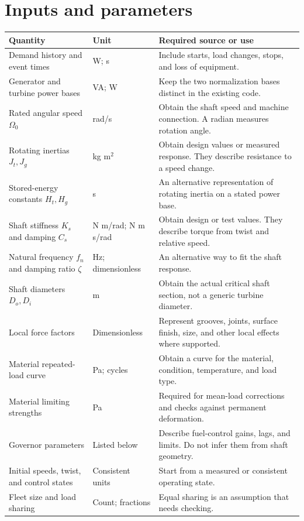 \documentclass[11pt,a4paper]{report}
\begin{document}
\section{Inputs and parameters}
\begin{longtable}{L{0.22\textwidth}L{0.17\textwidth}L{0.49\textwidth}}
\toprule Quantity & Unit & Required source or use \\ \midrule\endhead
Demand history and event times & W; s & Include starts, load changes, stops, and loss of equipment. \\
Generator and turbine power bases & VA; W & Keep the two normalization bases distinct in the existing code. \\
Rated angular speed $\Omega_0$ & rad/s & Obtain the shaft speed and machine connection. A radian measures rotation angle. \\
Rotating inertias $J_t,J_g$ & kg m$^2$ & Obtain design values or measured response. They describe resistance to a speed change. \\
Stored-energy constants $H_t,H_g$ & s & An alternative representation of rotating inertia on a stated power base. \\
Shaft stiffness $K_s$ and damping $C_s$ & N m/rad; N m s/rad & Obtain design or test values. They describe torque from twist and relative speed. \\
Natural frequency $f_n$ and damping ratio $\zeta$ & Hz; dimensionless & An alternative way to fit the shaft response. \\
Shaft diameters $D_o,D_i$ & m & Obtain the actual critical shaft section, not a generic turbine diameter. \\
Local force factors & Dimensionless & Represent grooves, joints, surface finish, size, and other local effects where supported. \\
Material repeated-load curve & Pa; cycles & Obtain a curve for the material, condition, temperature, and load type. \\
Material limiting strengths & Pa & Required for mean-load corrections and checks against permanent deformation. \\
Governor parameters & Listed below & Describe fuel-control gains, lags, and limits. Do not infer them from shaft geometry. \\
Initial speeds, twist, and control states & Consistent units & Start from a measured or consistent operating state. \\
Fleet size and load sharing & Count; fractions & Equal sharing is an assumption that needs checking. \\

\end{longtable}
\end{document}
